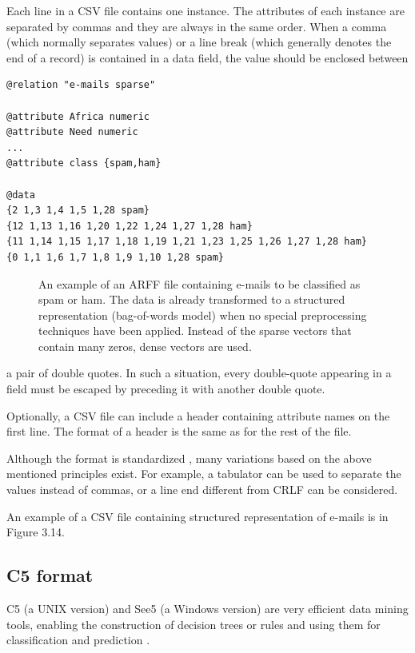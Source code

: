 Each line in a CSV file contains one instance. The attributes of each instance
are separated by commas and they are always in the same order. When a comma
(which normally separates values) or a line break (which generally denotes the
end of a record) is contained in a data field, the value should be enclosed between

\begin{verbatim}
@relation "e-mails sparse"

@attribute Africa numeric
@attribute Need numeric
...
@attribute class {spam,ham}

@data
{2 1,3 1,4 1,5 1,28 spam}
{12 1,13 1,16 1,20 1,22 1,24 1,27 1,28 ham}
{11 1,14 1,15 1,17 1,18 1,19 1,21 1,23 1,25 1,26 1,27 1,28 ham}
{0 1,1 1,6 1,7 1,8 1,9 1,10 1,28 spam}
\end{verbatim}

\begin{figure}[H]
    \centering
    \caption{An example of an ARFF file containing e-mails to be classified as spam or ham.
The data is already transformed to a structured representation (bag-of-words model) when no
special preprocessing techniques have been applied. Instead of the sparse vectors that contain
many zeros, dense vectors are used.
}
    \label{fig:placeholder311}
\end{figure}

\hspace{-1.5em}a pair of double quotes. In such a situation, every double-quote appearing in a
field must be escaped by preceding it with another double quote.

Optionally, a CSV file can include a header containing attribute names on the
first line. The format of a header is the same as for the rest of the file.

Although the format is standardized \cite{ref248}, many variations based on the
above mentioned principles exist. For example, a tabulator can be used to separate the values instead of commas, or a line end different from CRLF can be
considered.

An example of a CSV file containing structured representation of e-mails is
in Figure 3.14.

\subsection{C5 format}

C5 (a UNIX version) and See5 (a Windows version) are very efficient data mining tools, enabling the construction of decision trees or rules and using them for
classification and prediction \cite{ref220}.

